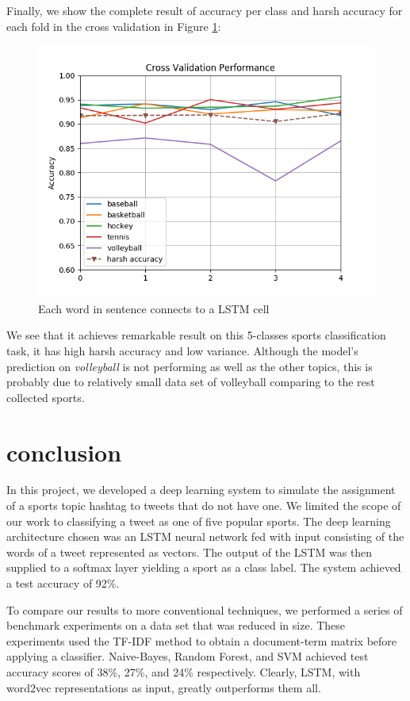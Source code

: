 \documentclass[journal, a4paper]{IEEEtran}
\begin{document}
Finally, we show the complete result of accuracy per class and harsh accuracy for each fold in the cross validation in Figure \ref{fig:5}:
\begin{figure}[!hbt]
	\centering
	\includegraphics[width=\columnwidth]{cv.png}
	\caption{Each word in sentence connects to a LSTM cell}
	\label{fig:5}
\end{figure}


We see that it achieves remarkable result on this 5-classes sports classification task, it has high harsh accuracy and low variance. Although the model's prediction on \textit{volleyball} is not performing as well as the other topics, this is probably due to relatively small data set of volleyball comparing to the rest collected sports.
\section{conclusion}
In this project, we developed a deep learning system to simulate the assignment of a sports topic hashtag to tweets that do not have one. We limited the scope of our work to classifying a tweet as one of five popular sports. The deep learning architecture chosen was an LSTM neural network fed with input consisting of the words of a tweet represented as vectors. The output of the LSTM was then supplied to a softmax layer yielding a sport as a class label. The system achieved a test accuracy of 92\%.

To compare our results to more conventional techniques, we performed a series of benchmark experiments on a data set that was reduced in size. These experiments used the TF-IDF method to obtain a document-term matrix before applying a classifier. Naive-Bayes, Random Forest, and SVM achieved test accuracy scores of 38\%, 27\%, and 24\% respectively. Clearly, LSTM, with word2vec representations as input, greatly outperforms them all.
\end{document}
